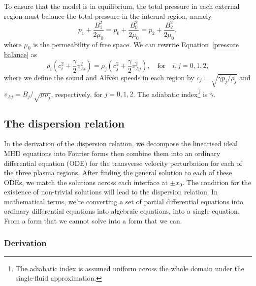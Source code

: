 \documentclass[12pt]{../style-files/ociamthesis}
\begin{document}
To ensure that the model is in equilibrium, the total pressure in each external region must balance the total pressure in the internal region, namely
\begin{equation}
	p_1 + \frac{B_1^2}{2\mu_0} = p_0 + \frac{B_0^2}{2\mu_0} = p_2 + \frac{B_2^2}{2\mu_0}, \label{pressure balance}
\end{equation}
where $\mu_0$ is the permeability of free space. We can rewrite Equation~\eqref{pressure balance} as
\begin{equation}
\rho_i\left(c_i^2 + \frac{\gamma}{2}v_{Ai}^2\right) = \rho_j\left(c_j^2 + \frac{\gamma}{2}v_{Aj}^2\right), \quad \text{for} \quad i, j = 0, 1, 2, \label{sound speeds}
\end{equation}
where we define the sound and Alfv\'{e}n speeds in each region by $c_j = \sqrt{\gamma p_j/\rho_j}$ and $v_{Aj} = B_j/\sqrt{\mu\rho_j}$, respectively, for $j = 0, 1, 2$. The adiabatic index\footnote{The adiabatic index is assumed uniform across the whole domain under the single-fluid approximation.} is $\gamma$.


\subsection{The dispersion relation}

In the derivation of the dispersion relation, we decompose the linearised ideal MHD equations into Fourier forms then combine them into an ordinary differential equation (ODE) for the transverse velocity perturbation for each of the three plasma regions. After finding the general solution to each of these ODEs, we match the solutions across each interface at $\pm x_0$. The condition for the existence of non-trivial solutions will lead to the dispersion relation. In mathematical terms, we're converting a set of partial differential equations into ordinary differential equations into algebraic equations, into a single equation. From a form that we cannot solve into a form that we can.


\subsubsection{Derivation} \label{sec: asym slab DR der}
\end{document}
